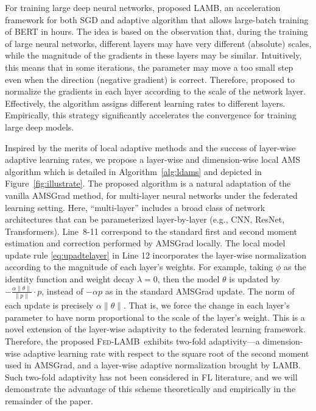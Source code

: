 \documentclass[11pt]{article}
\newcommand{\algo}{\textsc{Fed-LAMB}}
\begin{document}
For training large deep neural networks, \cite{you2019large} proposed LAMB, an acceleration framework for both SGD and adaptive algorithm that allows large-batch training of BERT in hours. The idea is based on the observation that, during the training of large neural networks, different layers may have very different (absolute) scales, while the magnitude of the gradients in these layers may be similar. Intuitively, this means that in some iterations, the parameter may move a too small step even when the direction (negative gradient) is correct. Therefore, \cite{you2019large} proposed to normalize the gradients in each layer according to the scale of the network layer. Effectively, the algorithm assigns different learning rates to different layers. Empirically, this strategy significantly accelerates the convergence for training large deep models.

Inspired by the merits of local adaptive methods and the success of layer-wise adaptive learning rates, we propose a layer-wise and dimension-wise local AMS algorithm which is detailed in Algorithm~\ref{alg:ldams} and  depicted in Figure~\ref{fig:illustrate}. The proposed algorithm is a natural adaptation of the vanilla AMSGrad method, for multi-layer neural networks under the federated learning setting. Here, ``multi-layer'' includes a broad class of network architectures that can be parameterized layer-by-layer (e.g., CNN, ResNet, Transformers). Line~8-11 correspond to the standard first and second moment estimation and correction performed by AMSGrad locally. The local model update rule \eqref{eq:upadtelayer} in Line 12 incorporates the layer-wise normalization according to the magnitude of each layer's weights. For example, taking $\phi$ as the identity function and weight decay $\lambda=0$, then the model $\theta$ is updated by $-\frac{\alpha \| \theta\|}{\|p\|}\cdot p$, instead of $-\alpha p$ as in the standard AMSGrad update. The norm of each update is precisely $\alpha \|\theta\|$. That is, we force the change in each layer's parameter to have norm proportional to the scale of the layer's weight. This is a novel extension of the layer-wise adaptivity to the federated learning framework. Therefore, the proposed \algo\ exhibits two-fold adaptivity---a dimension-wise adaptive learning rate with respect to the square root of the second moment used in AMSGrad, and a layer-wise adaptive normalization brought by LAMB. Such two-fold adaptivity has not been considered in FL literature, and we will demonstrate the advantage of this scheme theoretically and empirically in the remainder of the paper.
\end{document}
